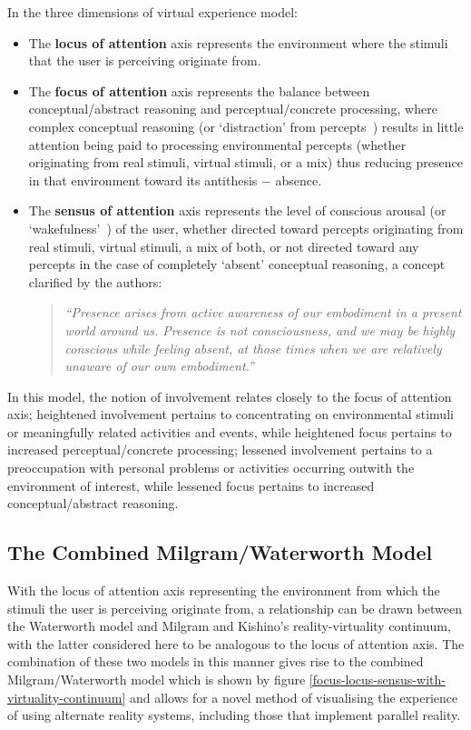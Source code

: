 In the three dimensions of virtual experience model:
\begin{itemize}
	\item The \textbf{locus of attention} axis represents the environment where the stimuli that the user is perceiving originate from.
	\item The \textbf{focus of attention} axis represents the balance between conceptual/abstract reasoning and perceptual/concrete processing, where complex conceptual reasoning (or `distraction' from percepts~\cite{Chalmers2014}) results in little attention being paid to processing environmental percepts (whether originating from real stimuli, virtual stimuli, or a mix) thus reducing presence\presencefootnote{} in that environment toward its antithesis $-$ absence\absencefootnote{}.
	\item The \textbf{sensus of attention} axis represents the level of conscious arousal (or `wakefulness'~\cite{Laureys2009}) of the user, whether directed toward percepts originating from real stimuli, virtual stimuli, a mix of both, or not directed toward any percepts in the case of completely `absent' conceptual reasoning, a concept clarified by the authors:

\begin{quote}
	\textit{``Presence arises from active awareness of our embodiment in a present world around us. Presence is not consciousness, and we may be highly conscious while feeling absent, at those times when we are relatively unaware of our own embodiment.''}~\cite{Waterworth2014}
\end{quote}
\end{itemize}

In this model, the notion of involvement relates closely to the focus of attention axis; heightened involvement pertains to concentrating on environmental stimuli or meaningfully related activities and events, while heightened focus pertains to increased perceptual/concrete processing; lessened involvement pertains to a preoccupation with personal problems or activities occurring outwith the environment of interest, while lessened focus pertains to increased conceptual/abstract reasoning.


\subsection{The Combined Milgram/Waterworth Model}
\label{combined-milgram-waterworth-model}
With the locus of attention axis representing the environment from which the stimuli the user is perceiving originate from, a relationship can be drawn between the Waterworth model and Milgram and Kishino's reality-virtuality continuum, with the latter considered here to be analogous to the locus of attention axis. The combination of these two models in this manner gives rise to the combined Milgram/Waterworth model which is shown by figure \ref{focus-locus-sensus-with-virtuality-continuum} and allows for a novel method of visualising the experience of using alternate reality systems, including those that implement parallel reality.

